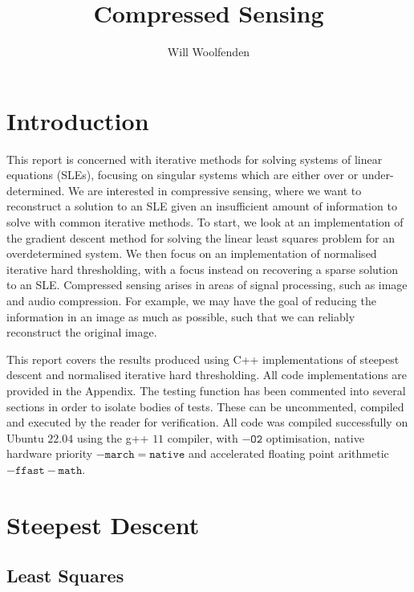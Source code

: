 \documentclass{article}
\title{Compressed Sensing}
\author{Will Woolfenden}
\begin{document}
\maketitle

\section{Introduction}

This report is concerned with iterative methods for solving systems of linear equations (SLEs),
focusing on singular systems which are either over or under-determined.
We are interested in compressive sensing, where we want to reconstruct a solution to an SLE given an insufficient amount of information to solve with common iterative methods.
To start, we look at an implementation of the gradient descent method for solving the linear least squares problem for an overdetermined system.
We then focus on an implementation of normalised iterative hard thresholding, with a focus instead on recovering a sparse solution to an SLE. 
Compressed sensing arises in areas of signal processing, such as image and audio compression. For example, we may have the goal of reducing the information in an image as much as possible,
such that we can reliably reconstruct the original image.

This report covers the results produced using C++ implementations of steepest descent and normalised iterative hard thresholding.
All code implementations are provided in the Appendix. The testing function has been commented into several sections in order to isolate bodies of tests.
These can be uncommented, compiled and executed by the reader for verification.
All code was compiled successfully on Ubuntu $22.04$ using the g++ $11$ compiler,
with $\mathtt{-O2}$ optimisation, native hardware priority $\mathtt{-march=native}$ and accelerated floating point arithmetic $\mathtt{-ffast-math}$.

\section{Steepest Descent}

\subsection{Least Squares}
\end{document}
